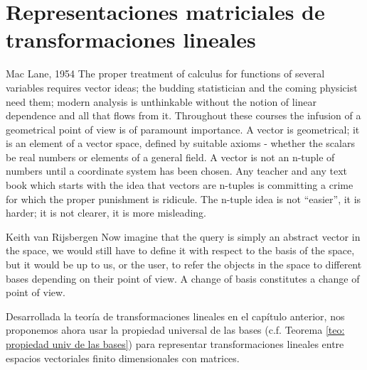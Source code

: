 \chapter{Representaciones matriciales de transformaciones lineales}


\begin{signquote}{Mac Lane, 1954}
	The proper treatment of calculus for functions of 
	several variables requires vector ideas; the budding statistician and
	the coming physicist need them; modern 
	analysis is unthinkable without the notion of linear
	dependence and all that flows from it. Throughout these
	courses the infusion of a geometrical point of view is of paramount 
	importance. A vector is geometrical; it is an element of a vector space,
	defined by suitable axioms - whether the scalars be real numbers or
	elements of a general field. A vector is not an n-tuple of numbers
	until a coordinate system has been chosen. Any teacher and any
	text book which starts with the idea that vectors are
	n-tuples is committing a crime for which the proper punishment is ridicule.
	The n-tuple idea is not ``easier'', it is harder; it is not clearer, it is
	more misleading. 
\end{signquote}
	
\vspace{1cm}

\begin{signquote}{Keith van Rijsbergen}
	Now imagine that the query is
	simply an abstract vector in the space, we would still have to define it
	with respect to the basis of the space, but it would be up to us, or the
	user, to refer the objects in the space to different bases depending on
	their point of view. A change of basis constitutes a change of point of
	view.
\end{signquote}



\label{chapter: representaciones matriciales de transformaciones lineales}
Desarrollada la teoría de transformaciones lineales en
el capítulo anterior, nos proponemos ahora usar la propiedad
universal de las bases (c.f. Teorema
\ref{teo: propiedad univ de las bases}) para representar 
transformaciones lineales entre espacios vectoriales finito dimensionales
con matrices. 

